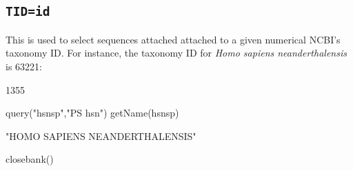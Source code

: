 \documentclass{article}
\begin{document}
\subsection{\texttt{TID=id}}

This is used to select sequences attached attached to a given numerical 
NCBI's taxonomy ID. For instance, the taxonomy ID for 
\textit{Homo sapiens neanderthalensis} is 63221:


\begin{Schunk}
\begin{Soutput}
[1] 1355
\end{Soutput}
\begin{Sinput}
 query("hsnsp","PS hsn")
 getName(hsnsp)
\end{Sinput}
\begin{Soutput}
[1] "HOMO SAPIENS NEANDERTHALENSIS"
\end{Soutput}
\begin{Sinput}
 closebank()
\end{Sinput}
\end{Schunk}
\end{document}
